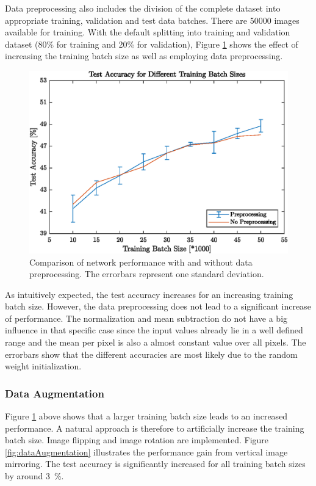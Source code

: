   	Data preprocessing also includes the division of the complete dataset into appropriate training, validation and test data batches. There are 50000 images available for training. With the default splitting into training and validation dataset (80\% for training and 20\% for validation), Figure \ref{fig:dataPreprocessing} shows the effect of increasing the training batch size as well as employing data preprocessing.

  	\begin{figure}[h!]
  		\centering
   		\includegraphics{images/dataPreprocessing}
   		\caption{Comparison of network performance with and without data preprocessing. The errorbars represent one standard deviation.}
   		\label{fig:dataPreprocessing}
   	\end{figure}

   	As intuitively expected, the test accuracy increases for an increasing training batch size. However, the data preprocessing does not lead to a significant increase of performance. The normalization and mean subtraction do not have a big influence in that specific case since the input values already lie in a well defined range and the mean per pixel is also a almost constant value over all pixels. The errorbars show that the different accuracies are most likely due to the random weight initialization.

\FloatBarrier
\subsubsection{Data Augmentation}

Figure \ref{fig:dataPreprocessing} above shows that a larger training batch size leads to an increased performance. A natural approach is therefore to artificially increase the training batch size. Image flipping and image rotation are implemented. Figure \ref{fig:dataAugmentation} illustrates the performance gain from vertical image mirroring. The test accuracy is significantly increased for all training batch sizes by around \SI{3}{\percent}.

